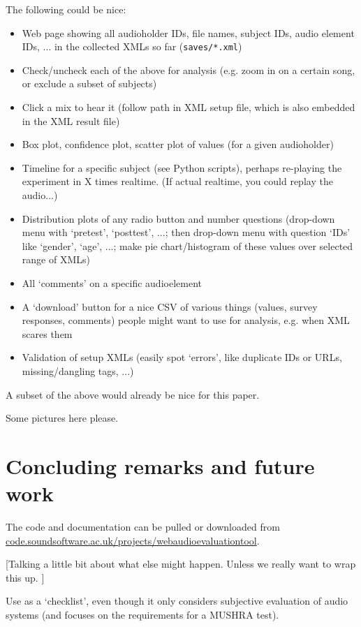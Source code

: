 \documentclass{sig-alternate}
\begin{document}
	The following could be nice: 
	
	\begin{itemize}[noitemsep,nolistsep]
		\item Web page showing all audioholder IDs, file names, subject IDs, audio element IDs, ... in the collected XMLs so far (\texttt{saves/*.xml})
		\item Check/uncheck each of the above for analysis (e.g. zoom in on a certain song, or exclude a subset of subjects)
		\item Click a mix to hear it (follow path in XML setup file, which is also embedded in the XML result file)
		\item Box plot, confidence plot, scatter plot of values (for a given audioholder)
		\item Timeline for a specific subject (see Python scripts), perhaps re-playing the experiment in X times realtime. (If actual realtime, you could replay the audio...)
		\item Distribution plots of any radio button and number questions (drop-down menu with `pretest', `posttest', ...; then drop-down menu with question `IDs' like `gender', `age', ...; make pie chart/histogram of these values over selected range of XMLs)
		\item All `comments' on a specific audioelement
		\item A `download' button for a nice CSV of various things (values, survey responses, comments) people might want to use for analysis, e.g. when XML scares them
		\item Validation of setup XMLs (easily spot `errors', like duplicate IDs or URLs, missing/dangling tags, ...)
	\end{itemize}

	A subset of the above would already be nice for this paper. 
	
	Some pictures here please. 

\section{Concluding remarks and future work}
	
	The code and documentation can be pulled or downloaded from \url{code.soundsoftware.ac.uk/projects/webaudioevaluationtool}. 
	
	[Talking a little bit about what else might happen. Unless we really want to wrap this up. ]

	Use \cite{schoeffler2015mushra} as a `checklist', even though it only considers subjective evaluation of audio systems (and focuses on the requirements for a MUSHRA test).
\end{document}

